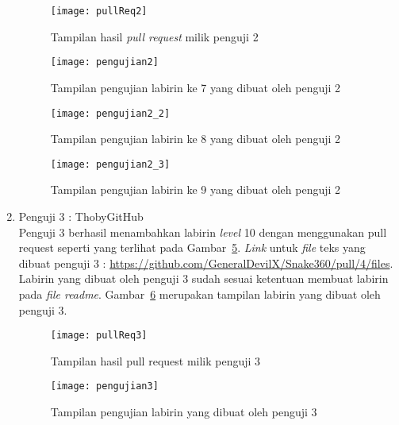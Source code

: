 \begin{enumerate}
	\begin{figure}[H]
		\centering  
		\texttt{[image: pullReq2]}  
		\caption[Tampilan hasil \textit{pull request} milik penguji 2]{Tampilan hasil \textit{pull request} milik penguji 2}
		\label{fig:pullReq2} 
	\end{figure}
	
	\begin{figure}[H]
		\centering  
		\texttt{[image: pengujian2]}
		\caption[Tampilan pengujian labirin ke 7 yang dibuat oleh penguji 2]{Tampilan pengujian labirin ke 7 yang dibuat oleh penguji 2}
		\label{fig:pengujian2} 
	\end{figure}
	
	\begin{figure}[H]
		\centering  
		\texttt{[image: pengujian2\_2]}  
		\caption[Tampilan pengujian labirin ke 8 yang dibuat oleh penguji 2]{Tampilan pengujian labirin ke 8 yang dibuat oleh penguji 2}
		\label{fig:pengujian2_2} 
	\end{figure}
	
	\begin{figure}[H]
		\centering  
		\texttt{[image: pengujian2\_3]}  
		\caption[Tampilan pengujian labirin ke 9 yang dibuat oleh penguji 2]{Tampilan pengujian labirin ke 9 yang dibuat oleh penguji 2}
		\label{fig:pengujian2_3} 
	\end{figure}
	
	\item Penguji 3 : ThobyGitHub\\
	Penguji 3 berhasil menambahkan labirin \textit{level} 10 dengan menggunakan pull request seperti yang terlihat pada Gambar~\ref{fig:pullReq3}. \textit{Link} untuk \textit{file} teks yang dibuat penguji 3 : \url{https://github.com/GeneralDevilX/Snake360/pull/4/files}. Labirin yang dibuat oleh penguji 3 sudah sesuai ketentuan membuat labirin pada \textit{file readme}. Gambar~\ref{fig:pengujian3} merupakan tampilan labirin yang dibuat oleh penguji 3.
	
	\begin{figure}[H]
		\centering  
		\texttt{[image: pullReq3]}  
		\caption[Tampilan hasil pull request milik penguji 3]{Tampilan hasil pull request milik penguji 3}
		\label{fig:pullReq3} 
	\end{figure}
	
	\begin{figure}[H]
		\centering  
		\texttt{[image: pengujian3]}  
		\caption[Tampilan pengujian labirin yang dibuat oleh penguji 3]{Tampilan pengujian labirin yang dibuat oleh penguji 3}
		\label{fig:pengujian3} 
	\end{figure}
	

\end{enumerate}

